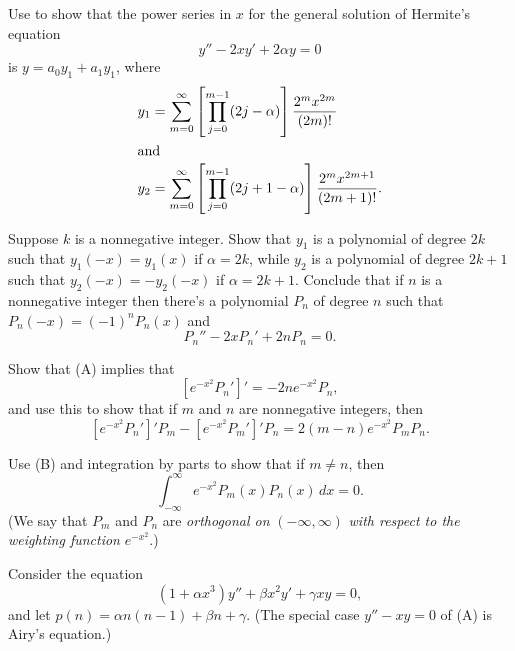 \begin{exerciselist}
\item\label{exer:7.2.31}\begin{alist}
\item %
Use   to show that the power series in $x$
for the general solution
 of Hermite's equation
\[
y''-2xy'+2\alpha y=0
\]
is $y=a_0y_1+a_1y_1$, where
\begin{align*}
y_1&=\sum_{m=0}^\infty \left[\prod_{j=0}^{m-1}(2j-\alpha)
\right]\frac{2^mx^{2m}}{(2m)!}\\
\shortintertext{and}
y_2&=\sum_{m=0}^\infty \left[\prod_{j=0}^{m-1}(2j+1-\alpha)
\right]\frac{2^mx^{2m+1}}{(2m+1)!}.
\end{align*}
\item %
Suppose $k$ is a nonnegative integer. Show that $y_1$ is a
polynomial of degree $2k$ such that $y_1(-x)=y_1(x)$ if $\alpha=2k$,
while $y_2$ is a polynomial of degree $2k+1$ such that
$y_2(-x)=-y_2(-x)$ if $\alpha=2k+1$. Conclude that if $n$ is a
nonnegative integer then there's a polynomial $P_n$ of degree $n$
such that $P_n(-x)=(-1)^nP_n(x)$ and
\[
P_n''-2xP_n'+2nP_n=0.
\tag{A}
\]
\item %
Show that (A) implies that
\[
[e^{-x^2}P_n']'=-2ne^{-x^2}P_n,
\]
and use this to show that if $m$ and $n$ are nonnegative integers, then
\[
[e^{-x^2}P_n']'P_m-[e^{-x^2}P_m']'P_n=
2(m-n)e^{-x^2}P_mP_n.
\tag{B}
\]
\item %
Use (B) and integration by parts to show that
if $m\ne n$, then
\[
\int_{-\infty}^\infty e^{-x^2}P_m(x)P_n(x)\,dx=0.
\]
(We say  that $P_m$ and $P_n$ are \emph{\color{blue}orthogonal on}
$(-\infty,\infty)$ \emph{\color{blue}with respect to the weighting function}
$e^{-x^2}$.)
\end{alist}

\item\label{exer:7.2.32}Consider the equation
\[
\left(1+\alpha x^3\right)y''+\beta x^2y'+\gamma xy=0,
\tag{A}
\]
and let
$p(n)=\alpha n(n-1)+\beta n+\gamma$.
(The special case $y''-xy=0$ of (A) is
 Airy's equation.)


\end{exerciselist}
